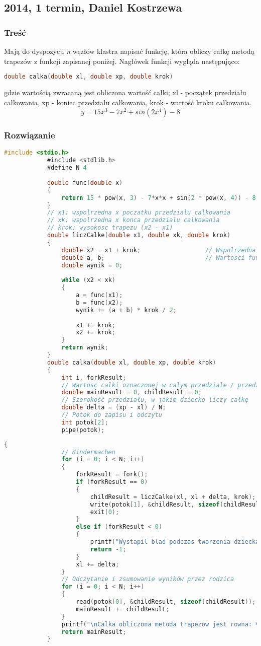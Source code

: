 	\subsection{2014, 1 termin, Daniel Kostrzewa}
		\subsubsection{Treść}
			Mają do dyspozycji \textit{n} węzłów klastra napisać funkcję, która obliczy całkę metodą trapezów z funkcji zapisanej poniżej. Nagłówek funkcji wygląda następująco:
			\begin{lstlisting}[language=C]
				double calka(double xl, double xp, double krok)
			\end{lstlisting}
			gdzie wartością zwracaną jest obliczona wartość całki; xl - początek przedziału całkowania, xp - koniec przedziału całkowania, krok - wartość kroku całkowania.
			$$ y=15x^3-7x^2+sin(2x^4)-8 $$
		\subsubsection{Rozwiązanie}
		\begin{lstlisting}[language=C]
			#include <stdio.h>
			#include <stdlib.h>
			#define N 4
			
			double func(double x)
			{
				return 15 * pow(x, 3) - 7*x*x + sin(2 * pow(x, 4)) - 8;
			}
			// x1: wspolrzedna x poczatku przedzialu calkowania
			// xk: wspolrzedna x konca przedzialu calkowania
			// krok: wysokosc trapezu (x2 - x1)
			double liczCalke(double x1, double xk, double krok)
			{
				double x2 = x1 + krok;					// Wspolrzedna x drugiej podstawy trapezu
				double a, b;							// Wartosci funkcji w x1, x2
				double wynik = 0;
				
				while (x2 < xk)
				{
					a = func(x1);
					b = func(x2);
					wynik += (a + b) * krok / 2;
					
					x1 += krok;
					x2 += krok;
				}
				return wynik;
			}
			double calka(double xl, double xp, double krok)
			{
				int i, forkResult;
				// Wartosc calki oznaczonej w calym przedziale / przedziale dziecka
				double mainResult = 0, childResult = 0;
				// Szerokość przedziału, w jakim dziecko liczy całkę
				double delta = (xp - xl) / N;
				// Potok do zapisu i odczytu
				int potok[2];
				pipe(potok);
		\end{lstlisting}	
		\newpage
		\begin{lstlisting}[language=C]
			{
				// Kindermachen
				for (i = 0; i < N; i++)
				{
					forkResult = fork();
					if (forkResult == 0)
					{
						childResult = liczCalke(xl, xl + delta, krok);
						write(potok[1], &childResult, sizeof(childResult));
						exit(0);
					}
					else if (forkResult < 0)
					{
						printf("Wystapil blad podczas tworzenia dziecka");
						return -1;
					}
					xl += delta;
				}
				// Odczytanie i zsumowanie wyników przez rodzica
				for (i = 0; i < N; i++)
				{
					read(potok[0], &childResult, sizeof(childResult));
					mainResult += childResult;
				}
				printf("\nCalka obliczona metoda trapezow jest rowna: %f\n", mainResult);
				return mainResult;
			}
		\end{lstlisting}
	\newpage 

